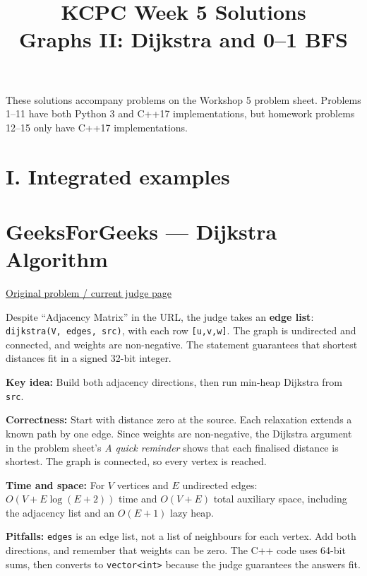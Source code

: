 \documentclass[11pt]{article}
\title{KCPC Week 5 Solutions\\Graphs II: Dijkstra and 0--1 BFS}
\author{}
\date{}
\newcommand{\insight}[1]{\par\medskip\noindent\textbf{Key idea:} #1}
\newcommand{\correct}[1]{\par\textbf{Correctness:} #1}
\newcommand{\bounds}[1]{\par\textbf{Time and space:} #1}
\newcommand{\pitfalls}[1]{\par\textbf{Pitfalls:} #1}
\begin{document}
\maketitle\thispagestyle{fancy}

These solutions accompany problems on the Workshop 5 problem sheet. Problems 1--11 have both Python 3 and C++17 implementations, but homework problems 12--15 only have C++17 implementations.

\section*{I. Integrated examples}

\section{GeeksForGeeks --- Dijkstra Algorithm}
\href{https://www.geeksforgeeks.org/problems/implementing-dijkstra-set-1-adjacency-matrix/1}{Original problem / current judge page}

Despite ``Adjacency Matrix'' in the URL, the judge takes an \textbf{edge list}: \texttt{dijkstra(V, edges, src)}, with each row \texttt{[u,v,w]}. The graph is undirected and connected, and weights are non-negative. The statement guarantees that shortest distances fit in a signed 32-bit integer.
\insight{Build both adjacency directions, then run min-heap Dijkstra from \texttt{src}.}
\correct{Start with distance zero at the source. Each relaxation extends a known path by one edge. Since weights are non-negative, the Dijkstra argument in the problem sheet's \emph{A quick reminder} shows that each finalised distance is shortest. The graph is connected, so every vertex is reached.}
\bounds{For $V$ vertices and $E$ undirected edges: $O(V+E\log(E+2))$ time and $O(V+E)$ total auxiliary space, including the adjacency list and an $O(E+1)$ lazy heap.}
\pitfalls{\texttt{edges} is an edge list, not a list of neighbours for each vertex. Add both directions, and remember that weights can be zero. The C++ code uses 64-bit sums, then converts to \texttt{vector<int>} because the judge guarantees the answers fit.}
\end{document}
